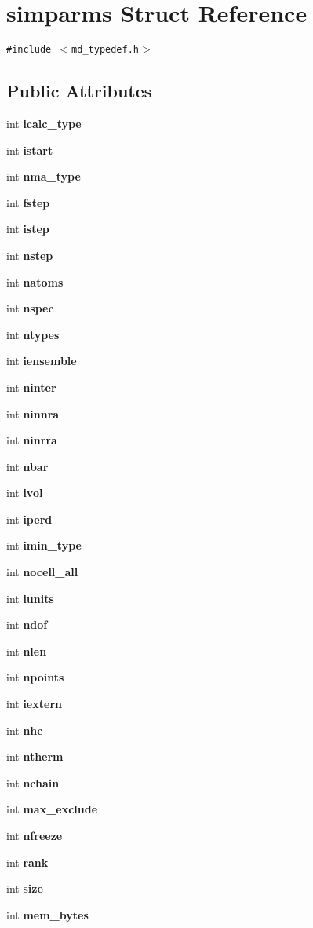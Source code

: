 \section{simparms Struct Reference}
\label{structsimparms}
{\tt \#include $<$md\_\-typedef.h$>$}

\subsection*{Public Attributes}
\begin{CompactItemize}
\item 
int {\bf icalc\_\-type}
\item 
int {\bf istart}
\item 
int {\bf nma\_\-type}
\item 
int {\bf fstep}
\item 
int {\bf istep}
\item 
int {\bf nstep}
\item 
int {\bf natoms}
\item 
int {\bf nspec}
\item 
int {\bf ntypes}
\item 
int {\bf iensemble}
\item 
int {\bf ninter}
\item 
int {\bf ninnra}
\item 
int {\bf ninrra}
\item 
int {\bf nbar}
\item 
int {\bf ivol}
\item 
int {\bf iperd}
\item 
int {\bf imin\_\-type}
\item 
int {\bf nocell\_\-all}
\item 
int {\bf iunits}
\item 
int {\bf ndof}
\item 
int {\bf nlen}
\item 
int {\bf npoints}
\item 
int {\bf iextern}
\item 
int {\bf nhc}
\item 
int {\bf ntherm}
\item 
int {\bf nchain}
\item 
int {\bf max\_\-exclude}
\item 
int {\bf nfreeze}
\item 
int {\bf rank}
\item 
int {\bf size}
\item 
int {\bf mem\_\-bytes}
\item 

\end{CompactItemize}
